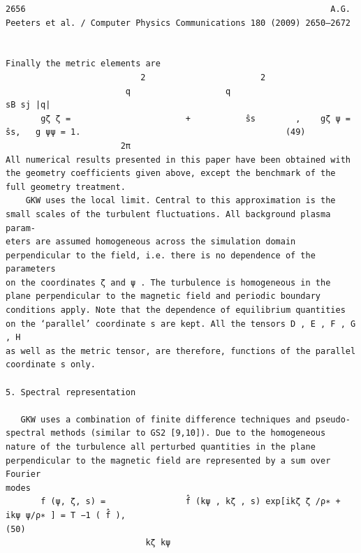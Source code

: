 \documentclass[a4paper]{article}
\newcommand{\gkwpagefont}{\fontsize{6.0pt}{7.55pt}\selectfont}
\begin{document}
\newpage
\begin{Verbatim}[fontsize=\gkwpagefont]
2656                                                             A.G. Peeters et al. / Computer Physics Communications 180 (2009) 2650–2672


Finally the metric elements are
                           2                       2
                        q                   q                            sB sj |q|
       gζ ζ =                       +           ŝs        ,    gζ ψ =               ŝs,   g ψψ = 1.                                         (49)
                       2π
All numerical results presented in this paper have been obtained with the geometry coefficients given above, except the benchmark of the
full geometry treatment.
    GKW uses the local limit. Central to this approximation is the small scales of the turbulent fluctuations. All background plasma param-
eters are assumed homogeneous across the simulation domain perpendicular to the field, i.e. there is no dependence of the parameters
on the coordinates ζ and ψ . The turbulence is homogeneous in the plane perpendicular to the magnetic field and periodic boundary
conditions apply. Note that the dependence of equilibrium quantities on the ‘parallel’ coordinate s are kept. All the tensors D , E , F , G , H
as well as the metric tensor, are therefore, functions of the parallel coordinate s only.

5. Spectral representation

   GKW uses a combination of finite difference techniques and pseudo-spectral methods (similar to GS2 [9,10]). Due to the homogeneous
nature of the turbulence all perturbed quantities in the plane perpendicular to the magnetic field are represented by a sum over Fourier
modes
       f (ψ, ζ, s) =                f̂ (kψ , kζ , s) exp[ikζ ζ /ρ∗ + ikψ ψ/ρ∗ ] = T −1 ( f̂ ),                                                (50)
                            kζ kψ


\end{Verbatim}
\end{document}

